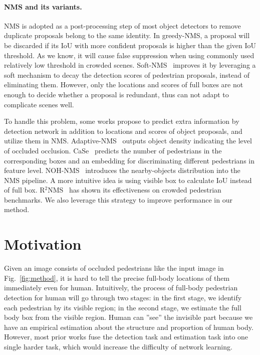 \documentclass[10pt,twocolumn,letterpaper]{article}
\begin{document}
\paragraph{NMS and its variants.}
NMS is adopted as a post-processing step of most object detectors to remove duplicate proposals belong to the same identity. In greedy-NMS, a proposal will be discarded if its IoU with more confident proposals is higher than the given IoU threshold. As we know, it will cause false suppression when using commonly used relatively low threshold in crowded scenes. Soft-NMS~\cite{softnms} improves it by leveraging a soft mechanism to decay the detection scores of pedestrian proposals, instead of eliminating them. However, only the locations and scores of full boxes are not enough to decide whether a proposal is redundant, thus can not adapt to complicate scenes well.

To handle this problem, some works propose to predict extra information by detection network in addition to locations and scores of object proposals, and utilize them in NMS. Adaptive-NMS~\cite{adaptiveNMS} outputs object density indicating the level of occluded occlusion. CaSe~\cite{xie2020count} predicts the number of pedestrians in the corresponding boxes and an embedding for discriminating different pedestrians in feature level. NOH-NMS~\cite{zhou2020NOH-NMS} introduces the nearby-objects distribution into the NMS pipeline. A more intuitive idea is using visible box to calculate IoU instead of full box. R$^2$NMS~\cite{huang2020R2nms} has shown its effectiveness on crowded pedestrian benchmarks. We also leverage this strategy to improve performance in our method.

\section{Motivation}
Given an image consists of occluded pedestrians like the input image in Fig.~\ref{fig:method}, it is hard to tell the precise full-body locations of them immediately even for human. Intuitively, the process of full-body pedestrian detection for human will go through two stages: in the first stage, we identify each pedestrian by its visible region; in the second stage, we estimate the full body box from the visible region. Human can ''see'' the invisible part because we have an empirical estimation about the structure and proportion of human body. However, most prior works fuse the detection task and estimation task into one single harder task, which would increase the difficulty of network learning.
\end{document}
